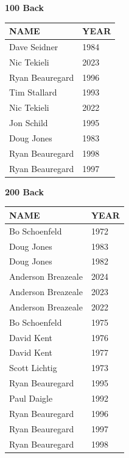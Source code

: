 \begin{table}[H]
\centering
\begin{minipage}[t]{0.48\textwidth}
\centering
\textbf{100 Back}\\[0.1cm]
\begin{tabular}{@{}p{2.8cm}p{1.2cm}@{}}
\hline
    \textbf{NAME} & \textbf{YEAR} \\
\hline
    Dave Seidner & 1984 \\
    Nic Tekieli & 2023 \\
    Ryan Beauregard & 1996 \\
    Tim Stallard & 1993 \\
    Nic Tekieli & 2022 \\
    Jon Schild & 1995 \\
    Doug Jones & 1983 \\
    Ryan Beauregard & 1998 \\
    Ryan Beauregard & 1997 \\
\hline
\end{tabular}
\end{minipage}\hfill
\begin{minipage}[t]{0.48\textwidth}
\centering
\textbf{200 Back}\\[0.1cm]
\begin{tabular}{@{}p{2.8cm}p{1.2cm}@{}}
\hline
    \textbf{NAME} & \textbf{YEAR} \\
\hline
    Bo Schoenfeld & 1972 \\
    Doug Jones & 1983 \\
    Doug Jones & 1982 \\
    Anderson Breazeale & 2024 \\
    Anderson Breazeale & 2023 \\
    Anderson Breazeale & 2022 \\
    Bo Schoenfeld & 1975 \\
    David Kent & 1976 \\
    David Kent & 1977 \\
    Scott Lichtig & 1973 \\
    Ryan Beauregard & 1995 \\
    Paul Daigle & 1992 \\
    Ryan Beauregard & 1996 \\
    Ryan Beauregard & 1997 \\
    Ryan Beauregard & 1998 \\
\hline
\end{tabular}
\end{minipage}
\end{table}

